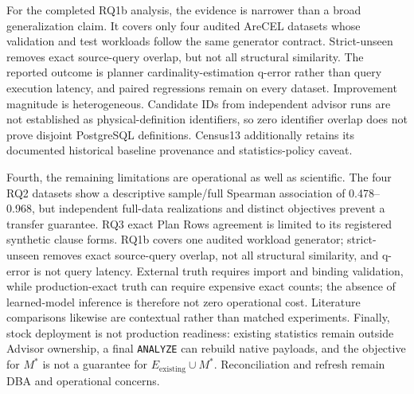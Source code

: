 For the completed RQ1b analysis, the evidence is narrower than a broad
generalization claim. It covers only four audited AreCEL datasets whose
validation and test workloads follow the same generator contract. Strict-unseen
removes exact source-query overlap, but not all structural similarity. The
reported outcome is planner cardinality-estimation q-error rather than query
execution latency, and paired regressions remain on every dataset. Improvement
magnitude is heterogeneous. Candidate IDs from independent advisor runs are
not established as physical-definition identifiers, so zero identifier overlap
does not prove disjoint PostgreSQL definitions. Census13 additionally retains
its documented historical baseline provenance and statistics-policy caveat.

Fourth, the remaining limitations are operational as well as scientific.
The four RQ2 datasets show a descriptive sample/full Spearman association of
0.478--0.968, but independent full-data realizations and distinct objectives
prevent a transfer guarantee. RQ3 exact Plan Rows agreement is limited to its
registered synthetic clause forms. RQ1b covers one audited workload generator;
strict-unseen removes exact source-query overlap, not all structural similarity,
and q-error is not query latency. External truth requires import and binding
validation, while production-exact truth can require expensive exact counts;
the absence of learned-model inference is therefore not zero operational cost.
Literature comparisons likewise are contextual rather than matched experiments.
Finally, stock deployment is not production readiness: existing statistics
remain outside Advisor ownership, a final \texttt{ANALYZE} can rebuild native
payloads, and the objective for $M^*$ is not a guarantee for
$E_{\mathrm{existing}}\cup M^*$. Reconciliation and refresh remain DBA and
operational concerns.
